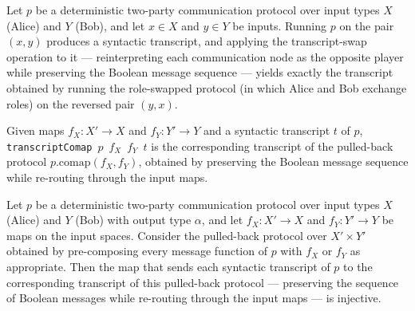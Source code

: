 \begin{theorem}
\label{CommunicationComplexity.Deterministic.Protocol.transcriptSwap_transcript}
\leanok
{}
Let $p$ be a deterministic two-party communication protocol over input types $X$ (Alice)
and $Y$ (Bob), and let $x \in X$ and $y \in Y$ be inputs. Running $p$ on the pair
$(x,y)$ produces a syntactic transcript, and applying the transcript-swap operation to
it — reinterpreting each communication node as the opposite player while preserving the
Boolean message sequence — yields exactly the transcript obtained by running the
role-swapped protocol (in which Alice and Bob exchange roles) on the reversed pair
$(y,x)$.
\end{theorem}

\begin{definition}
\label{CommunicationComplexity.Deterministic.Protocol.transcriptComap}
\leanok
{}
Given maps $f_X : X' \to X$ and $f_Y : Y' \to Y$ and a syntactic transcript $t$ of
$p$, \texttt{transcriptComap}~$p$~$f_X$~$f_Y$~$t$ is the corresponding transcript of
the pulled-back protocol $p.\mathrm{comap}(f_X, f_Y)$, obtained by preserving the
Boolean message sequence while re-routing through the input maps.
\end{definition}

\begin{theorem}
\label{CommunicationComplexity.Deterministic.Protocol.transcriptComap_injective}
\leanok
{}
Let $p$ be a deterministic two-party communication protocol over input types $X$ (Alice)
and $Y$ (Bob) with output type $\alpha$, and let $f_X : X' \to X$ and $f_Y : Y' \to Y$
be maps on the input spaces. Consider the pulled-back protocol over $X' \times Y'$
obtained by pre-composing every message function of $p$ with $f_X$ or $f_Y$ as
appropriate. Then the map that sends each syntactic transcript of $p$ to the
corresponding transcript of this pulled-back protocol — preserving the sequence of
Boolean messages while re-routing through the input maps — is injective.
\end{theorem}


